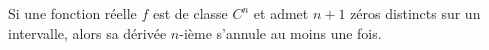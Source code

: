 Si une fonction réelle $f$ est de classe $C^n$ et admet $n+1$ zéros distincts sur un intervalle, alors sa dérivée $n$-ième s'annule au moins une fois.

\begin{reponses}
\end{reponses}

